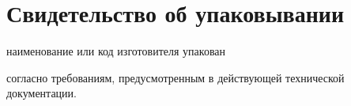 \newpage

\section{Свидетельство об упаковывании}

\noindent
\nameksaunumber
\bigskip\noindent%
%
\blankfieldtxt[c]{\textwidth}
  {\centering\nameManufacturer}
  {наименование или код изготовителя}
  {упакован}
  {}
  \par
%
\bigskip\noindent согласно требованиям, предусмотренным в действующей технической документации.

\bigskip
\noindent%
   \hfill
   \hfill

\bigskip
\noindent
